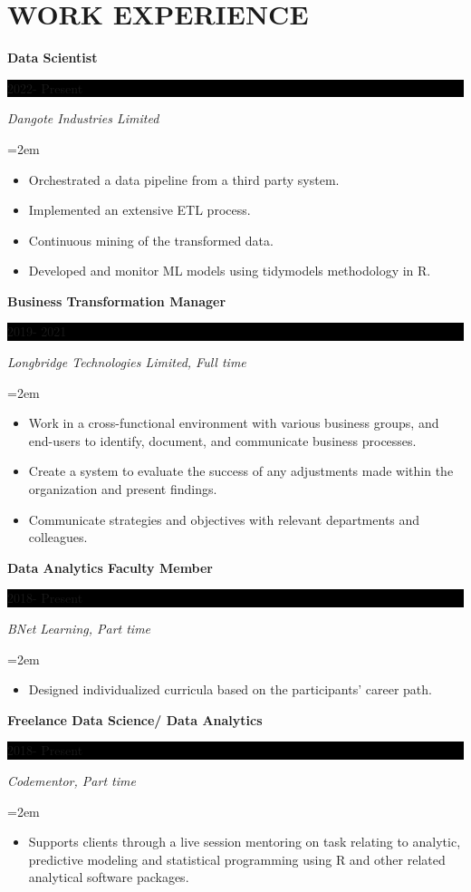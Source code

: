 \documentclass[paper=a4,fontsize=10pt]{scrartcl} %
\newcommand{\sepspace}{\vspace*{1em}}       %
\newcommand{\NewPart}[1]{\section*{\uppercase{#1}}}
\newcommand{\EducationEntry}[4]{
        \noindent \textbf{#1} \hfill      %
        \colorbox{Black}{%
            \parbox{6em}{%
            \hfill\color{White}#2}} \par  %
        \noindent \textit{#3} \par        %
        \noindent\hangindent=2em\hangafter=0 \small #4 %
        \normalsize \par}
\begin{document}

\NewPart{Work experience}{}

\EducationEntry{Data Scientist}{2022- Present}{Dangote Industries Limited}{
	\begin{itemize}
		\item Orchestrated a data pipeline from a third party system.
		\item Implemented an extensive ETL process.
		\item Continuous mining of the transformed data.
		\item Developed and monitor ML models using tidymodels methodology in R.
		
\end{itemize}}


\sepspace

\EducationEntry{Business Transformation Manager}{2019- 2021}{Longbridge Technologies Limited, Full time}{
	\begin{itemize}
		\item Work in a cross-functional environment with various business groups, and end-users to identify, document, and communicate business processes.
		\item Create a system to evaluate the success of any adjustments made within the organization and present findings.
		\item Communicate strategies and objectives with relevant departments and colleagues.
		
\end{itemize}}
\sepspace



\EducationEntry{Data Analytics Faculty Member}{2018- Present}{BNet Learning, Part time}{
\begin{itemize}
	\item Designed individualized curricula based on the participants' career path.
\end{itemize}}
\sepspace


\EducationEntry{Freelance Data Science/ Data Analytics}{2018- Present}{Codementor, Part time}{
	\begin{itemize}
		\item	Supports clients through a live session mentoring on task relating to analytic, predictive modeling and statistical programming using R and other related analytical software packages.
\end{itemize}}
\sepspace
\end{document}
